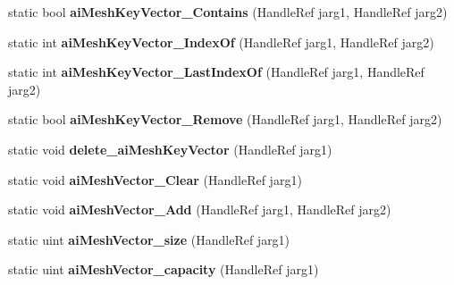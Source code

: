 \begin{DoxyCompactItemize}
\item 
\hypertarget{class_assimp_p_i_n_v_o_k_e_a83c3a6531d634997942c989cd9befb18}{static bool {\bfseries ai\+Mesh\+Key\+Vector\+\_\+\+Contains} (Handle\+Ref jarg1, Handle\+Ref jarg2)}\label{class_assimp_p_i_n_v_o_k_e_a83c3a6531d634997942c989cd9befb18}

\item 
\hypertarget{class_assimp_p_i_n_v_o_k_e_a6509b57339eadcb20714a3d363c9977a}{static int {\bfseries ai\+Mesh\+Key\+Vector\+\_\+\+Index\+Of} (Handle\+Ref jarg1, Handle\+Ref jarg2)}\label{class_assimp_p_i_n_v_o_k_e_a6509b57339eadcb20714a3d363c9977a}

\item 
\hypertarget{class_assimp_p_i_n_v_o_k_e_aeaaa5f14c88a557f368e8bce3274a9d8}{static int {\bfseries ai\+Mesh\+Key\+Vector\+\_\+\+Last\+Index\+Of} (Handle\+Ref jarg1, Handle\+Ref jarg2)}\label{class_assimp_p_i_n_v_o_k_e_aeaaa5f14c88a557f368e8bce3274a9d8}

\item 
\hypertarget{class_assimp_p_i_n_v_o_k_e_aaf3c1972d0b2ccf48e71b54a86c09214}{static bool {\bfseries ai\+Mesh\+Key\+Vector\+\_\+\+Remove} (Handle\+Ref jarg1, Handle\+Ref jarg2)}\label{class_assimp_p_i_n_v_o_k_e_aaf3c1972d0b2ccf48e71b54a86c09214}

\item 
\hypertarget{class_assimp_p_i_n_v_o_k_e_abce2adfe2464664c71075997a427d4f8}{static void {\bfseries delete\+\_\+ai\+Mesh\+Key\+Vector} (Handle\+Ref jarg1)}\label{class_assimp_p_i_n_v_o_k_e_abce2adfe2464664c71075997a427d4f8}

\item 
\hypertarget{class_assimp_p_i_n_v_o_k_e_a602473739ed24a4f85ce89c500052f47}{static void {\bfseries ai\+Mesh\+Vector\+\_\+\+Clear} (Handle\+Ref jarg1)}\label{class_assimp_p_i_n_v_o_k_e_a602473739ed24a4f85ce89c500052f47}

\item 
\hypertarget{class_assimp_p_i_n_v_o_k_e_ad05f395088a6c4d6e47c4f299cc493b7}{static void {\bfseries ai\+Mesh\+Vector\+\_\+\+Add} (Handle\+Ref jarg1, Handle\+Ref jarg2)}\label{class_assimp_p_i_n_v_o_k_e_ad05f395088a6c4d6e47c4f299cc493b7}

\item 
\hypertarget{class_assimp_p_i_n_v_o_k_e_af3df14e3bad846e056fcc620d6445aa7}{static uint {\bfseries ai\+Mesh\+Vector\+\_\+size} (Handle\+Ref jarg1)}\label{class_assimp_p_i_n_v_o_k_e_af3df14e3bad846e056fcc620d6445aa7}

\item 
\hypertarget{class_assimp_p_i_n_v_o_k_e_a6ba913a14aab8582452559faf9aa7b41}{static uint {\bfseries ai\+Mesh\+Vector\+\_\+capacity} (Handle\+Ref jarg1)}\label{class_assimp_p_i_n_v_o_k_e_a6ba913a14aab8582452559faf9aa7b41}


\end{DoxyCompactItemize}
